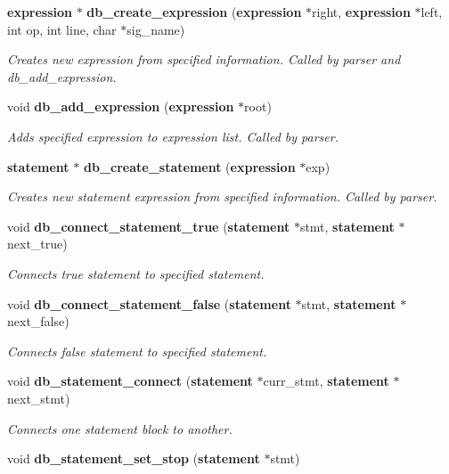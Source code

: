\begin{CompactItemize}
{\bf expression} $\ast$ {\bf db\_\-create\_\-expression} ({\bf expression} $\ast$right, {\bf expression} $\ast$left, int op, int line, char $\ast$sig\_\-name)
\begin{CompactList}\small\item\em Creates new expression from specified information. Called by parser and db\_\-add\_\-expression.\item\end{CompactList}\item 
void {\bf db\_\-add\_\-expression} ({\bf expression} $\ast$root)
\begin{CompactList}\small\item\em Adds specified expression to expression list. Called by parser.\item\end{CompactList}\item 
{\bf statement} $\ast$ {\bf db\_\-create\_\-statement} ({\bf expression} $\ast$exp)
\begin{CompactList}\small\item\em Creates new statement expression from specified information. Called by parser.\item\end{CompactList}\item 
void {\bf db\_\-connect\_\-statement\_\-true} ({\bf statement} $\ast$stmt, {\bf statement} $\ast$next\_\-true)
\begin{CompactList}\small\item\em Connects true statement to specified statement.\item\end{CompactList}\item 
void {\bf db\_\-connect\_\-statement\_\-false} ({\bf statement} $\ast$stmt, {\bf statement} $\ast$next\_\-false)
\begin{CompactList}\small\item\em Connects false statement to specified statement.\item\end{CompactList}\item 
void {\bf db\_\-statement\_\-connect} ({\bf statement} $\ast$curr\_\-stmt, {\bf statement} $\ast$next\_\-stmt)
\begin{CompactList}\small\item\em Connects one statement block to another.\item\end{CompactList}\item 
void {\bf db\_\-statement\_\-set\_\-stop} ({\bf statement} $\ast$stmt)

\end{CompactItemize}
